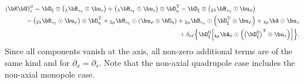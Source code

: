 %
\begin{eqnarray}
\lefteqn{(\bK\bU)_z^{\partial} =
\bD_\xi\otimes\left({}_{\lambda}\bB_{s_\eta}\odot{\bu_s}\right)+
\left({}_{\lambda}\bB_{s_\xi}\odot{\bu_s}\right)\otimes\bD^{\rm{T}}_\eta-
\bD_\xi\otimes\left({}_{2\lambda}\bB_{s_\eta}\odot{\bu_\phi}\right)}
\nonumber\\&&\mbox{}\hspace{2.2em}
-\left({}_{2\lambda}\bB_{s_\xi}\odot{\bu_\phi}\right)\otimes\bD^{\rm{T}}_\eta
+{}_{2\mu}\bB_{s_\xi}\odot\left(\bu_\phi\otimes\bD_\eta\right)+
{}_{2\mu}\bB_{s_\eta}\odot\left(\bD^{\rm{T}}_\xi\otimes \bu_\phi\right)+
{}_{4\mu}\bA\odot \bu_z
\nonumber\\&&\mbox{}\hspace{2.2em}
+\delta_{e\bar{e}}\Bigl\{
\bD^0_\xi\Bigl[{}_{4\mu}{\bA_0}\odot\left(\left(\bD^0_\xi\right)^{\rm{T}}\otimes
\bu_z\right)\Bigr]\Bigr\}.
\end{eqnarray}
%
Since all components vanish at the axis, all non-zero additional terms are of
the same kind and for $\partial_x=\partial_s$.
Note that the non-axial quadrupole case includes the non-axial monopole case.
%
